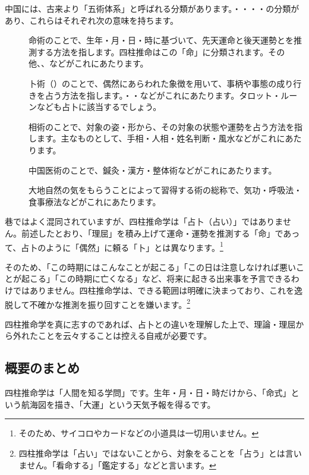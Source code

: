 \documentclass[a5paper,11pt,dvipdfmx]{tarticle}
\begin{document}
中国には、古来より「五術体系」と呼ばれる分類があります。・・・・の分類があり、これらはそれぞれ次の意味を持ちます。
\begin{description}
\item[]命術のことで、生年・月・日・時に基づいて、先天運命と後天運勢とを推測する方法を指します。四柱推命はこの「命」に分類されます。その他、、などがこれにあたります。
\item[]卜術（）のことで、偶然にあらわれた象徴を用いて、事柄や事態の成り行きを占う方法を指します。・・などがこれにあたります。タロット・ルーンなども占卜に該当するでしょう。
\item[]相術のことで、対象の姿・形から、その対象の状態や運勢を占う方法を指します。主なものとして、手相・人相・姓名判断・風水などがこれにあたります。
\item[]中国医術のことで、鍼灸・漢方・整体術などがこれにあたります。
\item[]大地自然の気をもらうことによって習得する術の総称で、気功・呼吸法・食事療法などがこれにあたります。
\end{description}

巷ではよく混同されていますが、四柱推命学は「占卜（占い）」ではありません。前述したとおり、「理屈」を積み上げて運命・運勢を推測する「命」であって、占卜のように「偶然」に頼る「卜」とは異なります。\footnote{そのため、サイコロやカードなどの小道具は一切用いません。}

そのため、「この時期にはこんなことが起こる」「この日は注意しなければ悪いことが起こる」「この時期に亡くなる」など、将来に起きる出来事を予言できるわけではありません。四柱推命学は、できる範囲は明確に決まっており、これを逸脱して不確かな推測を振り回すことを嫌います。\footnote{四柱推命学は「占い」ではないことから、対象をることを「占う」とは言いません。「看命する」「鑑定する」などと言います。}

四柱推命学を真に志すのであれば、占卜との違いを理解した上で、理論・理屈から外れたことを云々することは控える自戒が必要です。

\subsection{概要のまとめ}
四柱推命学は「人間を知る学問」です。生年・月・日・時だけから、「命式」という航海図を描き、「大運」という天気予報を得るです。
\end{document}
